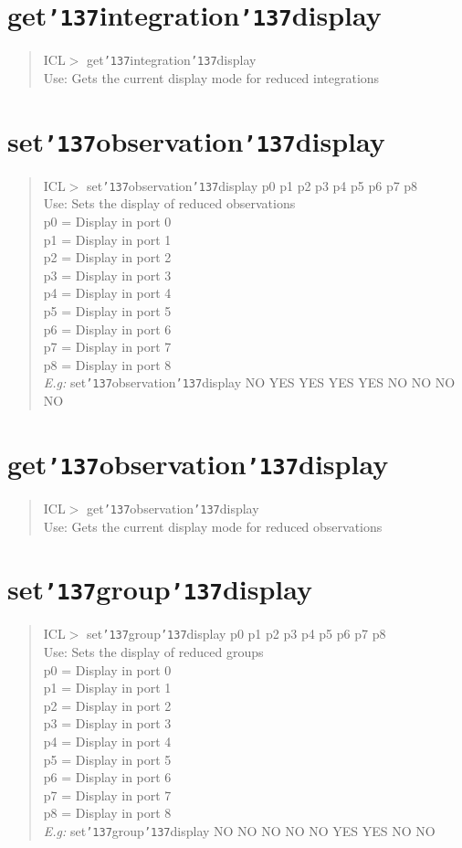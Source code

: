 \documentclass[a4paper]{book}
\renewcommand{\_}{{\tt\char'137}}
\begin{document}
\section{get\_integration\_display}
\begin{quote}
ICL$>$ get\_integration\_display \\
Use: Gets the current display mode for reduced integrations
\end{quote}
\section{set\_observation\_display}
\label{set_obs_display}
\begin{quote}
ICL$>$ set\_observation\_display p0 p1 p2 p3 p4 p5 p6 p7 p8 \\
Use: Sets the display of reduced observations \\
p0 = Display in port 0 \\
p1 = Display in port 1 \\
p2 = Display in port 2 \\
p3 = Display in port 3 \\
p4 = Display in port 4 \\
p5 = Display in port 5 \\
p6 = Display in port 6 \\
p7 = Display in port 7 \\
p8 = Display in port 8 \\
{\em E.g:} set\_observation\_display NO YES YES YES YES NO NO NO NO
\end{quote}
\section{get\_observation\_display}
\begin{quote}
ICL$>$ get\_observation\_display \\
Use: Gets the current display mode for reduced observations
\end{quote}
\section{set\_group\_display}
\label{set_grp_display}
\begin{quote}
ICL$>$ set\_group\_display p0 p1 p2 p3 p4 p5 p6 p7 p8 \\
Use: Sets the display of reduced groups \\
p0 = Display in port 0 \\
p1 = Display in port 1 \\
p2 = Display in port 2 \\
p3 = Display in port 3 \\
p4 = Display in port 4 \\
p5 = Display in port 5 \\
p6 = Display in port 6 \\
p7 = Display in port 7 \\
p8 = Display in port 8 \\
{\em E.g:} set\_group\_display NO NO NO NO NO YES YES NO NO
\end{quote}
\end{document}
